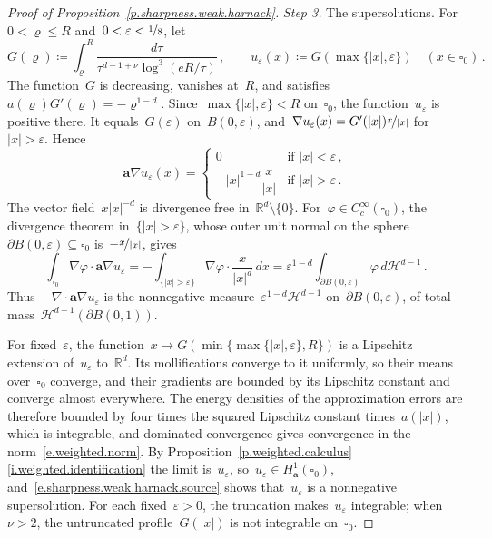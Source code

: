 \documentclass[11pt,letterpaper]{article}
\numberwithin{equation}{section}
\theoremstyle{definition}
\newcommand{\Rd}{\mathbb{R}^d}
\renewcommand{\a}{\mathbf{a}}
\newcommand{\eps}{\varepsilon}
\newcommand{\nf}{\nicefrac}
\newcommand{\cu}{\square}
\begin{document}
\begin{proof}[Proof of Proposition~\ref{p.sharpness.weak.harnack}]
\smallskip
\emph{Step 3.} The supersolutions. For~$0<\varrho\leq R$ and~$0<\eps<\nf18$, let
\begin{equation*}
	G(\varrho)\coloneqq\int_\varrho^R\frac{d\tau}{\tau^{d-1+\nu}\log^3(eR/\tau)}\,,\qquad u_\eps(x)\coloneqq G(\max\{|x|,\eps\})\quad(x\in\cu_0)\,.
\end{equation*}
The function~$G$ is decreasing, vanishes at~$R$, and satisfies~$a(\varrho)G'(\varrho)=-\varrho^{1-d}$. Since~$\max\{|x|,\eps\}<R$ on~$\cu_0$, the function~$u_\eps$ is positive there. It equals~$G(\eps)$ on~$B(0,\eps)$, and~$\nabla u_\eps(x)=G'(|x|)\nf x{|x|}$ for~$|x|>\eps$. Hence
\begin{equation*}
	\a\nabla u_\eps(x)=\begin{cases}0&\mbox{if }|x|<\eps\,,\\-|x|^{1-d}\dfrac x{|x|}&\mbox{if }|x|>\eps\,.\end{cases}
\end{equation*}
The vector field~$x|x|^{-d}$ is divergence free in~$\Rd\setminus\{0\}$. For~$\varphi\in C^\infty_c(\cu_0)$, the divergence theorem in~$\{|x|>\eps\}$, whose outer unit normal on the sphere~$\partial B(0,\eps)\subseteq\cu_0$ is~$-\nf x{|x|}$, gives
\begin{equation}
	\int_{\cu_0}\nabla\varphi\cdot\a\nabla u_\eps=-\int_{\{|x|>\eps\}}\nabla\varphi\cdot\frac x{|x|^d}\,dx=\eps^{1-d}\int_{\partial B(0,\eps)}\varphi\,d\mathcal H^{d-1}\,.
	\label{e.sharpness.weak.harnack.source}
\end{equation}
Thus~$-\nabla\cdot\a\nabla u_\eps$ is the nonnegative measure~$\eps^{1-d}\mathcal H^{d-1}$ on~$\partial B(0,\eps)$, of total mass~$\mathcal H^{d-1}(\partial B(0,1))$.

\smallskip
For fixed~$\eps$, the function~$x\mapsto G(\min\{\max\{|x|,\eps\},R\})$ is a Lipschitz extension of~$u_\eps$ to~$\Rd$. Its mollifications converge to it uniformly, so their means over~$\cu_0$ converge, and their gradients are bounded by its Lipschitz constant and converge almost everywhere. The energy densities of the approximation errors are therefore bounded by four times the squared Lipschitz constant times~$a(|x|)$, which is integrable, and dominated convergence gives convergence in the norm~\eqref{e.weighted.norm}. By Proposition~\ref{p.weighted.calculus}\ref{i.weighted.identification} the limit is~$u_\eps$, so~$u_\eps\in H^1_\a(\cu_0)$, and~\eqref{e.sharpness.weak.harnack.source} shows that~$u_\eps$ is a nonnegative supersolution. For each fixed~$\eps>0$, the truncation makes~$u_\eps$ integrable; when~$\nu>2$, the untruncated profile~$G(|x|)$ is not integrable on~$\cu_0$.


\end{proof}
\end{document}
